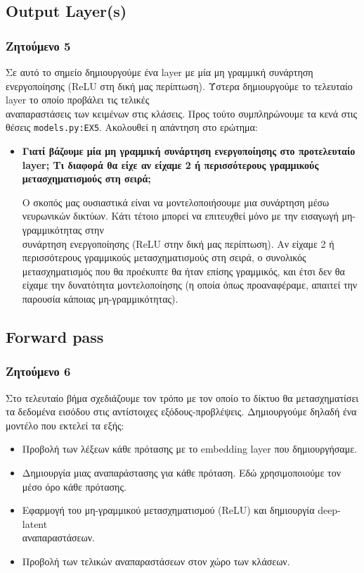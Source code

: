 \documentclass[a4paper, 12pt]{article}
\begin{document}
    \subsection{Output Layer(s)}
        \subsubsection*{Ζητούμενο 5}
            Σε αυτό το σημείο δημιουργούμε ένα layer με μία μη γραμμική συνάρτηση ενεργοποίησης (ReLU στη δική μας περίπτωση). Ύστερα δημιουργούμε το τελευταίο layer το οποίο προβάλει τις τελικές \\ αναπαραστάσεις των κειμένων στις κλάσεις. Προς τούτο συμπληρώνουμε τα κενά στις θέσεις \verb|models.py:EX5|. Ακολουθεί η απάντηση στο ερώτημα:
            
            \begin{itemize}
                \item \textbf{Γιατί βάζουμε μία μη γραμμική συνάρτηση ενεργοποίησης στο προτελευταίο layer; Τι διαφορά θα είχε αν είχαμε 2 ή περισσότερους γραμμικούς μετασχηματισμούς στη σειρά;}
                
                    Ο σκοπός μας ουσιαστικά είναι να μοντελοποιήσουμε μια συνάρτηση μέσω νευρωνικών δικτύων. Κάτι τέτοιο μπορεί να επιτευχθεί μόνο με την εισαγωγή μη-γραμμικότητας στην \\ συνάρτηση ενεργοποίησης (ReLU στην δική μας περίπτωση). Αν είχαμε 2 ή περισσότερους γραμμικούς μετασχηματισμούς στη σειρά, ο συνολικός μετασχηματισμός που θα προέκυπτε θα ήταν επίσης γραμμικός, και έτσι δεν θα είχαμε την δυνατότητα μοντελοποίησης (η οποία όπως προαναφέραμε, απαιτεί την παρουσία κάποιας μη-γραμμικότητας). 
            \end{itemize}
            
    \subsection{Forward pass}
        \subsubsection*{Ζητούμενο 6}
            Στο τελευταίο βήμα σχεδιάζουμε τον τρόπο με τον οποίο το δίκτυο θα μετασχηματίσει τα δεδομένα εισόδου στις αντίστοιχες εξόδους-προβλέψεις. Δημιουργούμε δηλαδή ένα μοντέλο που εκτελεί τα εξής:
            
            \begin{itemize}
                \item Προβολή των λέξεων κάθε πρότασης με το embedding layer που δημιουργήσαμε.
                \item Δημιουργία μιας αναπαράστασης για κάθε πρόταση. Εδώ χρησιμοποιούμε τον μέσο όρο κάθε πρότασης.
                \item Εφαρμογή του μη-γραμμικού μετασχηματισμού (ReLU) και δημιουργία deep-latent \\ αναπαραστάσεων.
                \item Προβολή των τελικών αναπαραστάσεων στον χώρο των κλάσεων.
            \end{itemize}
            
\end{document}
